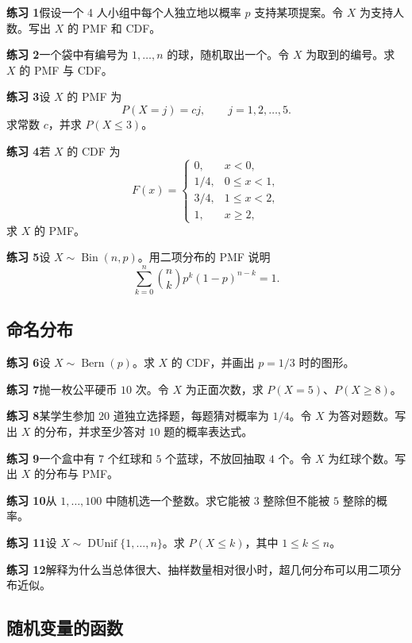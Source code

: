\documentclass[UTF8,12pt,a4paper,fontset=fandol]{ctexart}
\begin{document}
\noindent\textbf{练习 1}\quad 假设一个 4 人小组中每个人独立地以概率 $p$ 支持某项提案。令 $X$ 为支持人数。写出 $X$ 的 PMF 和 CDF。

\noindent\textbf{练习 2}\quad 一个袋中有编号为 $1,\ldots,n$ 的球，随机取出一个。令 $X$ 为取到的编号。求 $X$ 的 PMF 与 CDF。

\noindent\textbf{练习 3}\quad 设 $X$ 的 PMF 为
\[
  P(X=j)=cj,\qquad j=1,2,\ldots,5.
\]
求常数 $c$，并求 $P(X\le 3)$。

\noindent\textbf{练习 4}\quad 若 $X$ 的 CDF 为
\[
  F(x)=
  \begin{cases}
    0,&x<0,\\
    1/4,&0\le x<1,\\
    3/4,&1\le x<2,\\
    1,&x\ge 2,
  \end{cases}
\]
求 $X$ 的 PMF。

\noindent\textbf{练习 5}\quad 设 $X\sim\operatorname{Bin}(n,p)$。用二项分布的 PMF 说明
\[
  \sum_{k=0}^n \binom{n}{k}p^k(1-p)^{n-k}=1.
\]

\subsection*{命名分布}

\noindent\textbf{练习 6}\quad 设 $X\sim\operatorname{Bern}(p)$。求 $X$ 的 CDF，并画出 $p=1/3$ 时的图形。

\noindent\textbf{练习 7}\quad 抛一枚公平硬币 $10$ 次。令 $X$ 为正面次数，求 $P(X=5)$、$P(X\ge 8)$。

\noindent\textbf{练习 8}\quad 某学生参加 $20$ 道独立选择题，每题猜对概率为 $1/4$。令 $X$ 为答对题数。写出 $X$ 的分布，并求至少答对 $10$ 题的概率表达式。

\noindent\textbf{练习 9}\quad 一个盒中有 $7$ 个红球和 $5$ 个蓝球，不放回抽取 $4$ 个。令 $X$ 为红球个数。写出 $X$ 的分布与 PMF。

\noindent\textbf{练习 10}\quad 从 $1,\ldots,100$ 中随机选一个整数。求它能被 $3$ 整除但不能被 $5$ 整除的概率。

\noindent\textbf{练习 11}\quad 设 $X\sim\operatorname{DUnif}\{1,\ldots,n\}$。求 $P(X\le k)$，其中 $1\le k\le n$。

\noindent\textbf{练习 12}\quad 解释为什么当总体很大、抽样数量相对很小时，超几何分布可以用二项分布近似。

\subsection*{随机变量的函数}
\end{document}
